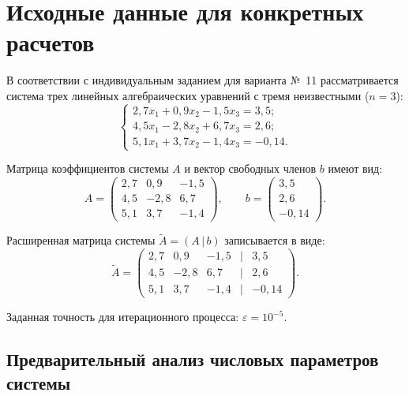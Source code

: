 \chapter{Исходные данные для конкретных расчетов}

В соответствии с индивидуальным заданием для варианта №~11 рассматривается система трех линейных алгебраических уравнений с тремя неизвестными ($n = 3$):
\begin{equation}
    \begin{cases}
        2{,}7x_1 + 0{,}9x_2 - 1{,}5x_3 = 3{,}5; \\
        4{,}5x_1 - 2{,}8x_2 + 6{,}7x_3 = 2{,}6; \\
        5{,}1x_1 + 3{,}7x_2 - 1{,}4x_3 = -0{,}14.
    \end{cases}
    \label{eq:var11}
\end{equation}

Матрица коэффициентов системы $A$ и вектор свободных членов $b$ имеют вид:
\begin{equation}
    A = \begin{pmatrix}
        2{,}7 & 0{,}9 & -1{,}5 \\
        4{,}5 & -2{,}8 & 6{,}7 \\
        5{,}1 & 3{,}7 & -1{,}4
    \end{pmatrix},
    \qquad
    b = \begin{pmatrix}
        3{,}5 \\
        2{,}6 \\
        -0{,}14
    \end{pmatrix}.
\end{equation}

Расширенная матрица системы $\widetilde{A} = (A\,|\,b)$ записывается в виде:
\begin{equation}
    \widetilde{A} = \begin{pmatrix}
        2{,}7 & 0{,}9 & -1{,}5 & | & 3{,}5 \\
        4{,}5 & -2{,}8 & 6{,}7 & | & 2{,}6 \\
        5{,}1 & 3{,}7 & -1{,}4 & | & -0{,}14
    \end{pmatrix}.
\end{equation}

Заданная точность для итерационного процесса: $\varepsilon = 10^{-5}$.

\section{Предварительный анализ числовых параметров системы}

